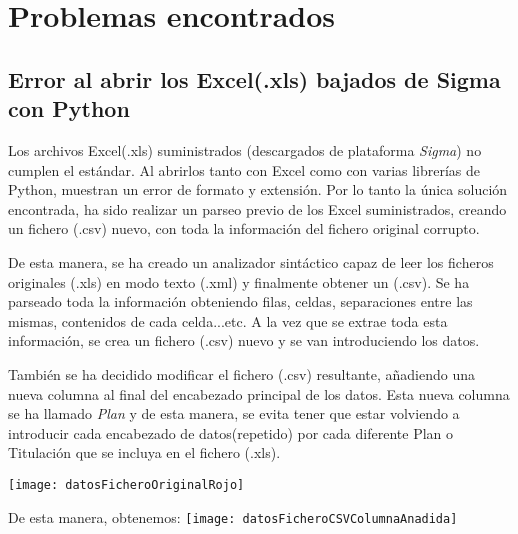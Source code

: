\section{Problemas encontrados}

\subsection{Error al abrir los Excel(.xls) bajados de Sigma con Python}
Los archivos Excel(.xls) suministrados (descargados de plataforma \emph{Sigma}) no cumplen el estándar. Al abrirlos tanto con Excel como con varias librerías de Python, muestran un error de formato y extensión. Por lo tanto la única solución encontrada, ha sido realizar un parseo previo de los Excel suministrados, creando un fichero (.csv) nuevo, con toda la información del fichero original corrupto.

De esta manera, se ha creado un analizador sintáctico capaz de leer los ficheros originales (.xls) en modo texto (.xml) y finalmente obtener un (.csv). Se ha parseado toda la información obteniendo filas, celdas, separaciones entre las mismas, contenidos de cada celda...etc. A la vez que se extrae toda esta información, se crea un fichero (.csv) nuevo y se van introduciendo los datos.

También se ha decidido modificar el fichero (.csv) resultante, añadiendo una nueva columna al final del encabezado principal de los datos. Esta nueva columna se ha llamado \emph{Plan} y de esta manera, se evita tener que estar volviendo a introducir cada encabezado de datos(repetido) por cada diferente Plan o Titulación que se incluya en el fichero (.xls).


\texttt{[image: datosFicheroOriginalRojo]}

De esta manera, obtenemos:
\texttt{[image: datosFicheroCSVColumnaAnadida]}







  

